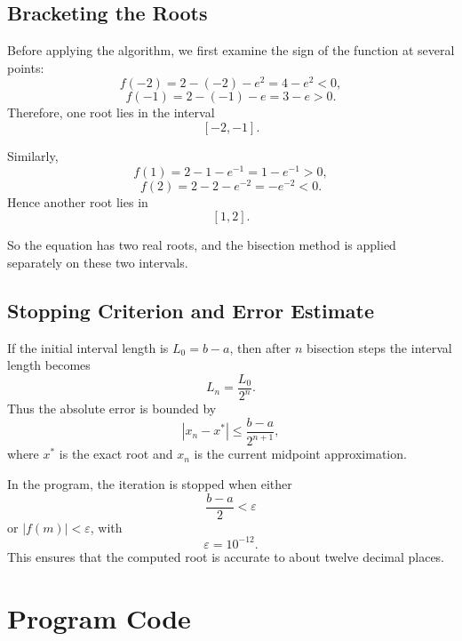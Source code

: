 \documentclass[12pt,a4paper]{article}
\begin{document}
\subsection*{Bracketing the Roots}

Before applying the algorithm, we first examine the sign of the function at several points:
\[
f(-2)=2-(-2)-e^2=4-e^2<0,
\]
\[
f(-1)=2-(-1)-e=3-e>0.
\]
Therefore, one root lies in the interval
\[
[-2,-1].
\]

Similarly,
\[
f(1)=2-1-e^{-1}=1-e^{-1}>0,
\]
\[
f(2)=2-2-e^{-2}=-e^{-2}<0.
\]
Hence another root lies in
\[
[1,2].
\]

So the equation has two real roots, and the bisection method is applied separately on these two intervals.

\subsection*{Stopping Criterion and Error Estimate}

If the initial interval length is $L_0=b-a$, then after $n$ bisection steps the interval length becomes
\[
L_n=\frac{L_0}{2^n}.
\]
Thus the absolute error is bounded by
\[
|x_n-x^\ast|\leq \frac{b-a}{2^{n+1}},
\]
where $x^\ast$ is the exact root and $x_n$ is the current midpoint approximation.

In the program, the iteration is stopped when either
\[
\frac{b-a}{2}<\varepsilon
\]
or $|f(m)|<\varepsilon$, with
\[
\varepsilon=10^{-12}.
\]
This ensures that the computed root is accurate to about twelve decimal places.

\section{Program Code}
\end{document}
